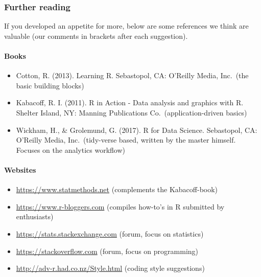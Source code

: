 \documentclass[
]{article}
\providecommand{\tightlist}{%
  \setlength{\itemsep}{0pt}\setlength{\parskip}{0pt}}
\begin{document}
\hypertarget{further-reading}{%
\subsubsection{Further reading}\label{further-reading}}

If you developed an appetite for more, below are some references we
think are valuable (our comments in brackets after each suggestion).

\hypertarget{books}{%
\paragraph{Books}\label{books}}

\begin{itemize}
\tightlist
\item
  Cotton, R. (2013). Learning R. Sebastopol, CA: O'Reilly Media,
  Inc.~(the basic building blocks)
\item
  Kabacoff, R. I. (2011). R in Action - Data analysis and graphics with
  R. Shelter Island, NY: Manning Publications Co.~(application-driven
  basics)
\item
  Wickham, H., \& Grolemund, G. (2017). R for Data Science. Sebastopol,
  CA: O'Reilly Media, Inc.~(tidy-verse based, written by the master
  himself. Focuses on the analytics workflow)
\end{itemize}

\hypertarget{websites}{%
\paragraph{Websites}\label{websites}}

\begin{itemize}
\tightlist
\item
  \url{https://www.statmethods.net} (complements the Kabacoff-book)
\item
  \url{https://www.r-bloggers.com} (compiles how-to's in R submitted by
  enthusiasts)
\item
  \url{https://stats.stackexchange.com} (forum, focus on statistics)
\item
  \url{https://stackoverflow.com} (forum, focus on programming)
\item
  \url{http://adv-r.had.co.nz/Style.html} (coding style suggestions)
\end{itemize}
\end{document}
